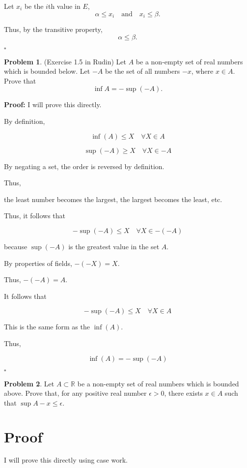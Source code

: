 \documentclass[12pt,oneside]{article}
\theoremstyle{definition}
\newtheorem{problem}{Problem}
\begin{document}
Let \( x_i \) be the \( i \)th value in \( E \),
\[
\alpha \leq x_i \quad \text{and} \quad x_i \leq \beta.
\]

Thus, by the transitive property,
\[
\alpha \leq \beta.
\]

\(\square\)


\newpage 

\begin{problem}
(Exercise 1.5 in Rudin)
Let $A$ be a non-empty set of real numbers which is bounded below. 
Let $-A$ be the set of all numbers $-x$, where $x\in A$. 
Prove that 
\[
\inf A = - \sup (-A).
\]
\end{problem}
\textbf{Proof:} I will prove this directly.

By definition,

\[
\inf(A) \leq X \quad \forall X \in A
\]

\[
\sup(-A) \geq X \quad \forall X \in -A
\]

By negating a set, the order is reversed by definition.

Thus, 

the least number becomes the largest, the largest becomes the least, etc.

Thus, it follows that

\[
- \sup(-A) \leq X \quad \forall X \in -(-A)
\]

because \( \sup(-A) \) is the greatest value in the set \( A \).

By properties of fields, \( -(-X) = X \).

Thus, \( -(-A) = A \).

It follows that

\[
- \sup(-A) \leq X \quad \forall X \in A
\]

This is the same form as the \( \inf(A) \).

Thus,

\[
\inf(A) = -\sup(-A)
\]

\(\square\)

\newpage

\begin{problem}
Let $A \subset \mathbb{R}$ be a non-empty set of real numbers which is bounded above. 
Prove that, for any positive real number $\epsilon > 0$, there exists $x \in A$ such that $\sup A - x \leq \epsilon$. 
\end{problem}

\section*{Proof}
I will prove this directly using case work.
\end{document}
